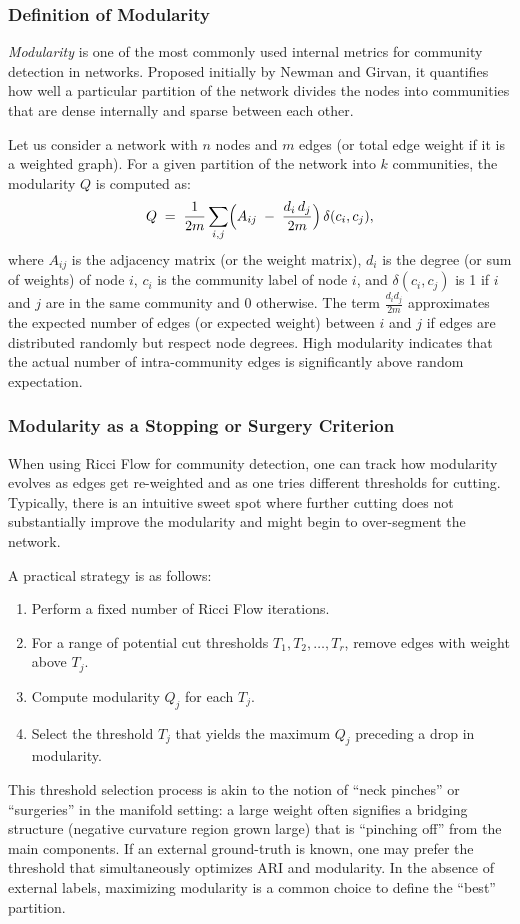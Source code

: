\subsubsection{Definition of Modularity}
\emph{Modularity} is one of the most commonly used internal metrics for community detection in networks. Proposed initially by Newman and Girvan, it quantifies how well a particular partition of the network divides the nodes into communities that are dense internally and sparse between each other.

Let us consider a network with $n$ nodes and $m$ edges (or total edge weight if it is a weighted graph). For a given partition of the network into $k$ communities, the modularity $Q$ is computed as:
\[
Q \;=\;\frac{1}{2m} \sum_{i,j}\Bigl(A_{ij} \;-\;\frac{d_i\,d_j}{2m}\Bigr) \,\delta(c_i, c_j),
\]
where $A_{ij}$ is the adjacency matrix (or the weight matrix), $d_i$ is the degree (or sum of weights) of node $i$, $c_i$ is the community label of node $i$, and $\delta(c_i, c_j)$ is 1 if $i$ and $j$ are in the same community and 0 otherwise. The term $\frac{d_i d_j}{2m}$ approximates the expected number of edges (or expected weight) between $i$ and $j$ if edges are distributed randomly but respect node degrees. High modularity indicates that the actual number of intra-community edges is significantly above random expectation.

\subsubsection{Modularity as a Stopping or Surgery Criterion}
When using Ricci Flow for community detection, one can track how modularity evolves as edges get re-weighted and as one tries different thresholds for cutting. Typically, there is an intuitive sweet spot where further cutting does not substantially improve the modularity and might begin to over-segment the network. 

A practical strategy is as follows:
\begin{enumerate}
    \item Perform a fixed number of Ricci Flow iterations. 
    \item For a range of potential cut thresholds $T_1, T_2, \dots, T_r$, remove edges with weight above $T_j$. 
    \item Compute modularity $Q_j$ for each $T_j$.
    \item Select the threshold $T_j$ that yields the maximum $Q_j$ preceding a drop in modularity.
\end{enumerate}
This threshold selection process is akin to the notion of “neck pinches” or “surgeries” in the manifold setting: a large weight often signifies a bridging structure (negative curvature region grown large) that is “pinching off” from the main components. If an external ground-truth is known, one may prefer the threshold that simultaneously optimizes ARI and modularity. In the absence of external labels, maximizing modularity is a common choice to define the “best” partition.

